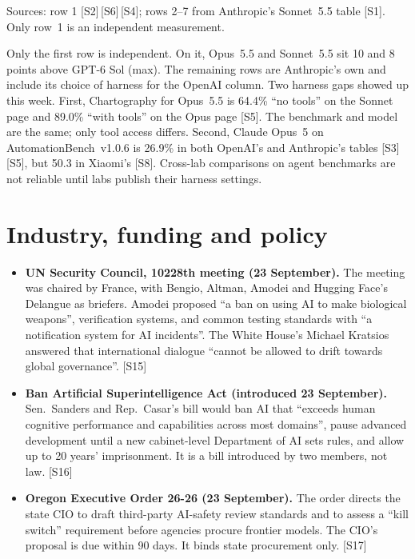 \documentclass[11pt,a4paper]{article}
\newcommand{\srcref}[1]{\textcolor{brandaccent}{[S#1]}}
\begin{document}
{\footnotesize\color{brandgrey}Sources: row 1 \srcref{2}\,\srcref{6}\,\srcref{4}; rows 2--7 from Anthropic's Sonnet~5.5 table \srcref{1}. Only row~1 is an independent measurement.}

Only the first row is independent. On it, Opus~5.5 and Sonnet~5.5 sit 10 and 8 points
above GPT-6 Sol (max). The remaining rows are Anthropic's own and include its choice of
harness for the OpenAI column. Two harness gaps showed up this week. First, Chartography for
Opus~5.5 is 64.4\% ``no tools'' on the Sonnet page and 89.0\% ``with tools'' on the Opus
page \srcref{5}. The benchmark and model are the same; only tool access differs.
Second, Claude Opus~5 on AutomationBench~v1.0.6 is 26.9\% in both OpenAI's and
Anthropic's tables \srcref{3}\,\srcref{5}, but 50.3 in Xiaomi's \srcref{8}. Cross-lab
comparisons on agent benchmarks are not reliable until labs publish their harness settings.

\section{Industry, funding and policy}
\begin{itemize}
  \item \textbf{UN Security Council, 10228th meeting (23 September).} The meeting was chaired by France,
  with Bengio, Altman, Amodei and Hugging Face's Delangue as briefers. Amodei proposed ``a ban on using AI to
  make biological weapons'', verification systems, and common testing standards with ``a notification
  system for AI incidents''. The White House's Michael Kratsios answered that international dialogue
  ``cannot be allowed to drift towards global governance''. \srcref{15}
  \item \textbf{Ban Artificial Superintelligence Act (introduced 23 September).} Sen.\ Sanders and Rep.\ Casar's
  bill would ban AI that ``exceeds human cognitive performance and capabilities across most domains'',
  pause advanced development until a new cabinet-level Department of AI sets rules, and allow up to
  20 years' imprisonment. It is a bill introduced by two members, not law. \srcref{16}
  \item \textbf{Oregon Executive Order 26-26 (23 September).} The order directs the state CIO to draft third-party
  AI-safety review standards and to assess a ``kill switch'' requirement before agencies procure frontier
  models. The CIO's proposal is due within 90 days. It binds state procurement only. \srcref{17}
\end{itemize}
\end{document}
